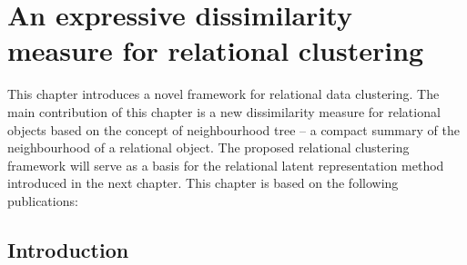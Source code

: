 \chapter{An expressive dissimilarity measure for relational clustering}\label{ch:clustering}


This chapter introduces a novel framework for relational data clustering.
The main contribution of this chapter is a new dissimilarity measure for relational objects based on the concept of neighbourhood tree -- a compact summary of the neighbourhood of a relational object.
The proposed relational clustering framework will serve as a basis for the relational latent representation method introduced in the next chapter.
This chapter is based on the following publications:

\begin{quote}
\end{quote}

\begin{quote}
\end{quote}




\section{Introduction}
\label{sec:Intro}




